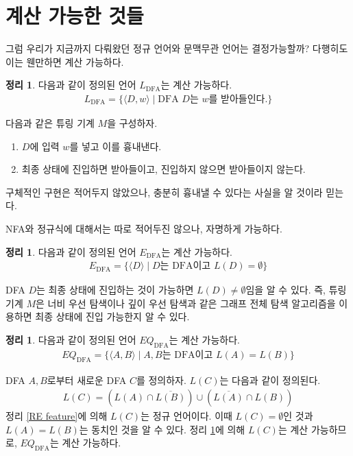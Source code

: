 \documentclass[b5paper, 11pt]{book}
\theoremstyle{definition}
\newtheorem{thm}[defn]{정리}
\newenvironment{pf*}{\pushQED{\qed}\pf}
{\popQED\endpf}
\begin{document}
\section{계산 가능한 것들}
그럼 우리가 지금까지 다뤄왔던 정규 언어와 문맥무관 언어는 결정가능할까? 다행히도 이는 웬만하면 계산 가능하다.
\begin{thm}
    다음과 같이 정의된 언어 $L_{\text{DFA}}$는 계산 가능하다.
    \begin{align*}
        L_{\text{DFA}} = \{ \langle D, w \rangle \;\vert\; 
        \text{DFA } D \text{는 }w\text{를 받아들인다.}\}
    \end{align*}
\end{thm}
\begin{pf*}
    다음과 같은 튜링 기계 $M$을 구성하자.
    \begin{enumerate}
        \item $D$에 입력 $w$를 넣고 이를 흉내낸다. 
        \item 최종 상태에 진입하면 받아들이고, 진입하지 않으면 받아들이지 않는다.
    \end{enumerate}
    구체적인 구현은 적어두지 않았으나, 충분히 흉내낼 수 있다는 사실을 알 것이라 믿는다.
\end{pf*}
NFA와 정규식에 대해서는 따로 적어두진 않으나, 자명하게 가능하다.
\begin{thm}
    \label{empty DFA}
    다음과 같이 정의된 언어 $E_{\text{DFA}}$는 계산 가능하다.
    \begin{align*}
        E_{\text{DFA}} = \{ \langle D \rangle \;\vert\; 
        D\text{는 DFA이고 } L(D) = \emptyset\}
    \end{align*}
\end{thm}
\begin{pf*}
    DFA $D$는 최종 상태에 진입하는 것이 가능하면 $L(D) \neq \emptyset$임을 알 수 있다. 즉, 튜링 기계 $M$은 너비 우선 탐색이나 깊이 우선 탐색과 같은 그래프 전체 탐색 알고리즘을 이용하면 최종 상태에 진입 가능한지 알 수 있다. 
\end{pf*}
\begin{thm}
    \label{DFA equiv decidable}
    다음과 같이 정의된 언어 $EQ_{\text{DFA}}$는 계산 가능하다.
    \begin{align*}
        EQ_{\text{DFA}} = \{ \langle A, B \rangle \;\vert\; 
        A, B\text{는 DFA이고 } L(A) = L(B)\}
    \end{align*}
\end{thm}
\begin{pf*}
    DFA $A, B$로부터 새로운 DFA $C$를 정의하자. $L(C)$는 다음과 같이 정의된다.
    \begin{align*}
        L(C) = \left( L(A) \cap \overline{L(B)} \right) \cup
        \left( \overline{L(A)} \cap L(B)\right)
    \end{align*}
    정리 \ref{RE feature}에 의해 $L(C)$는 정규 언어이다. 이때 $L(C) = \emptyset$인 것과 $L(A) = L(B)$는 동치인 것을 알 수 있다. 정리 \ref{empty DFA}에 의해 $L(C)$는 계산 가능하므로, $EQ_{\text{DFA}}$는 계산 가능하다.
\end{pf*}
\end{document}
